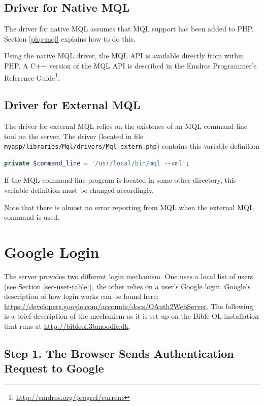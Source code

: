 \documentclass[11pt,oneside,a4paper]{memoir}
\begin{document}
\subsection{Driver for Native MQL}\label{mql-native}

The driver for native MQL assumes that MQL support has been added to PHP. Section \ref{php-mql}
explains how to do this.

Using the native MQL driver, the MQL API is available directly from within PHP. A C++ version of the
MQL API is described in the Emdros Programmer's Reference
Guide\footnote{\url{http://emdros.org/progref/current}}.

\subsection{Driver for External MQL}\label{mql-extern}

The driver for external MQL relies on the existence of an MQL command line tool on the server. The
driver (located in file \texttt{myapp/libraries/Mql/drivers/Mql\_extern.php}) contains this variable
definition

\begin{lstlisting}[language=PHP]
private $command_line = '/usr/local/bin/mql --xml';
\end{lstlisting}

If the MQL command line program is located in some other directory, this variable definition must be
changed accordingly.

Note that there is almost no error reporting from MQL when the external MQL command is used.


\section{Google Login}\label{sec-google-login}

The server provides two different login mechanism. One uses a local list of users (see Section
\ref{sec-user-table}), the other relies on a user's Google login. Google's description of how login
works can be found here: \url{https://developers.google.com/accounts/docs/OAuth2WebServer}.
The following is a brief description of the mechanism as it is set up on the Bible OL installation
that runs at \url{http://bibleol.3bmoodle.dk}.

\subsection*{Step 1. The Browser Sends Authentication Request to Google}
\end{document}
